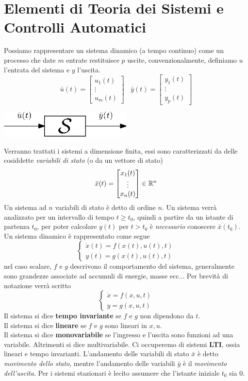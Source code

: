 \documentclass[10pt, letterpaper]{report}
\begin{document}
\section{Elementi di Teoria dei Sistemi e Controlli Automatici}
Possiamo rappresentare un sistema dinamico (a tempo continuo) come un processo 
che date $m$ entrate restituisce $p$ uscite, convenzionalmente, definiamo $u$ l'entrata del sistema 
e $y$ l'uscita.
$$ \bar u(t)=\begin{bmatrix}
    u_1(t)\\\vdots \\ u_m(t)
\end{bmatrix} \ \ \ \ 
\bar y(t)=\begin{bmatrix}
    y_1(t)\\\vdots \\ y_p(t)
\end{bmatrix} $$ \begin{center}
    \includegraphics[width=0.5\textwidth ]{images/sistema.eps}
\end{center}
Verranno trattati i sistemi a dimensione finita, essi sono caratterizzati 
da delle cosiddette \textit{variabili di stato} (o da un vettore di stato)
$$ \bar x(t)=\begin{bmatrix}
    x_1(t)\\\vdots \\ x_n(t)
\end{bmatrix}\in {\mathbb R}^n$$ 
Un sistema ad $n$ variabili di stato è detto di ordine $n$.\acc 
Un sistema verrà analizzato per un intervallo di tempo $t\ge t_0$, quindi a partire da un istante 
di partenza $t_0$, per poter calcolare $y(t)$ per $t>t_0$ è \textit{necessario} conoscere 
$\bar x (t_0)$. Un sistema dinamico è rappresentato come segue 
$$ \begin{cases}
    \dot{x}(t)=f(x(t),u(t),t)\\ 
    y(t)=g(x(t),u(t),t)
\end{cases}$$
nel caso scalare, $f$ e $g$ descrivono il comportamento del sistema, generalmente sono grandezze associate 
ad accumuli di energie, masse ecc... Per brevità di notazione 
verrà scritto 
$$ \begin{cases}
    \dot{x}=f(x,u,t)\\ y=g(x,u,t)
\end{cases}$$
Il sistema si dice \textbf{tempo invariante} se $f$ e $g$ non dipendono da $t$. \\ 
Il sistema si dice \textbf{lineare} se $f$ e $g$ sono lineari in $x,u$.\\
Il sistema si dice \textbf{monovariabile} se l'ingresso e l'uscita sono funzioni ad una variabile. Altrimenti 
si dice multivariabile.
\acc 
Ci occuperemo di sistemi \textbf{LTI}, ossia lineari e tempo invarianti. L'andamento delle variabili 
di stato $\bar x$ è detto \textit{movimento dello stato}, mentre l'andamento delle variabili 
$\bar y$ è il \textit{movimento dell'uscita}. Per i sistemi stazionari è lecito assumere che 
l'istante iniziale $t_0$ sia $0$.
\end{document}
